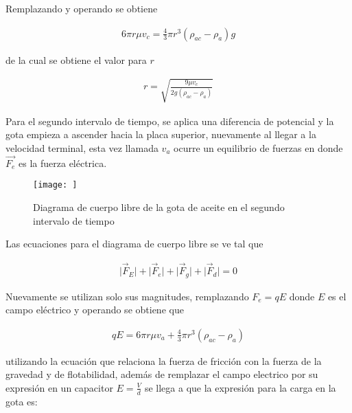 \documentclass[journal, table]{IEEEtran}
\begin{document}
Remplazando y operando se obtiene

\begin{equation}
    \begin{split}
        6\pi r\mu v_c=\frac{4}{3}\pi r^3(\rho_{ac}-\rho_a)g
    \end{split}
\end{equation}

de la cual se obtiene el valor para $r$

\begin{equation}
    \begin{split}
        r=\sqrt{\frac{9\mu v_c}{2g(\rho_{ac}-\rho_a)}}
    \end{split}
\end{equation}

Para el segundo intervalo de tiempo, se aplica una diferencia de potencial y la gota empieza a ascender hacia la placa superior, nuevamente al llegar a la velocidad terminal, esta vez llamada $v_a$ ocurre un equilibrio de fuerzas en donde $\Vec{F_e}$ es la fuerza eléctrica.

\begin{figure}
    \centering
    \texttt{[image: ]}
    \caption{Diagrama de cuerpo libre de la gota de aceite en el segundo intervalo de tiempo}
    \label{fig:enter-label}
\end{figure}

Las ecuaciones para el diagrama de cuerpo libre se ve tal que

\begin{equation}
    \begin{split}
        \lvert\Vec{F}_E\rvert + \lvert \Vec{F}_e\rvert + \lvert \Vec{F}_g\rvert+\lvert \Vec{F}_d\rvert =0
    \end{split}
\end{equation}

Nuevamente se utilizan solo sus magnitudes, remplazando $F_e=qE$ donde $E$ es el campo eléctrico y operando se obtiene que

\begin{equation}
    \begin{split}
        qE=6\pi r\mu v_a + \frac{4}{3}\pi r^3(\rho_{ac}-\rho_a)
    \end{split}
\end{equation}

utilizando la ecuación que relaciona la fuerza de fricción con la fuerza de la gravedad y de flotabilidad, además de remplazar el campo electrico por su expresión en un capacitor $E=\frac{V}{d}$ se llega a que la expresión para la carga en la gota es:
\end{document}
